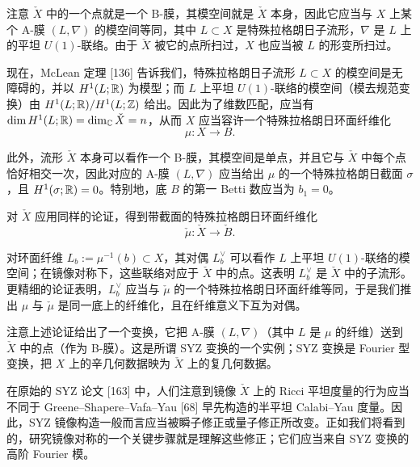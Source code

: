 注意 $\check X$ 中的一个点就是一个 B-膜，其模空间就是 $\check X$ 本身，因此它应当与 $X$ 上某个 A-膜 $(L,\nabla)$ 的模空间等同，其中 $L\subset X$ 是特殊拉格朗日子流形，$\nabla$ 是 $L$ 上的平坦 $U(1)$-联络。由于 $\check X$ 被它的点所扫过，$X$ 也应当被 $L$ 的形变所扫过。

现在，McLean 定理 [136] 告诉我们，特殊拉格朗日子流形 $L\subset X$ 的模空间是无障碍的，并以 $H^1(L;\mathbb{R})$ 为模型；而 $L$ 上平坦 $U(1)$-联络的模空间（模去规范变换）由 $H^1(L;\mathbb{R})/H^1(L;\mathbb{Z})$ 给出。因此为了维数匹配，应当有 $\dim H^1(L;\mathbb{R})=\dim_{\mathbb{C}}\check X=n$，从而 $X$ 应当容许一个特殊拉格朗日环面纤维化
\[
\mu:X\to B.
\]

此外，流形 $\check X$ 本身可以看作一个 B-膜，其模空间是单点，并且它与 $\check X$ 中每个点恰好相交一次，因此对应的 A-膜 $(L,\nabla)$ 应当给出 $\mu$ 的一个特殊拉格朗日截面 $\sigma$，且 $H^1(\sigma;\mathbb{R})=0$。特别地，底 $B$ 的第一 Betti 数应当为 $b_1=0$。

对 $\check X$ 应用同样的论证，得到带截面的特殊拉格朗日环面纤维化
\[
\check\mu:\check X\to\check B.
\]

对环面纤维 $L_b:=\mu^{-1}(b)\subset X$，其对偶 $L_b^\vee$ 可以看作 $L$ 上平坦 $U(1)$-联络的模空间；在镜像对称下，这些联络对应于 $\check X$ 中的点。这表明 $L_b^\vee$ 是 $\check X$ 中的子流形。更精细的论证表明，$L_b^\vee$ 应当与 $\check\mu$ 的一个特殊拉格朗日环面纤维等同，于是我们推出 $\mu$ 与 $\check\mu$ 是同一底上的纤维化，且在纤维意义下互为对偶。

注意上述论证给出了一个变换，它把 A-膜 $(L,\nabla)$（其中 $L$ 是 $\mu$ 的纤维）送到 $\check X$ 中的点（作为 B-膜）。这是所谓 SYZ 变换的一个实例；SYZ 变换是 Fourier 型变换，把 $X$ 上的辛几何数据映为 $\check X$ 上的复几何数据。

在原始的 SYZ 论文 [163] 中，人们注意到镜像 $\check X$ 上的 Ricci 平坦度量的行为应当不同于 Greene--Shapere--Vafa--Yau [68] 早先构造的半平坦 Calabi--Yau 度量。因此，SYZ 镜像构造一般而言应当被瞬子修正或量子修正所改变。正如我们将看到的，研究镜像对称的一个关键步骤就是理解这些修正；它们应当来自 SYZ 变换的高阶 Fourier 模。

